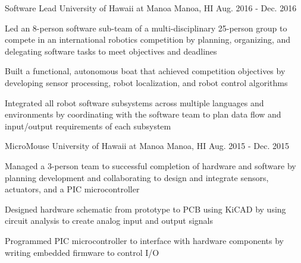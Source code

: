 

\begin{cventries}

  \cventry
    {Software Lead} %
    {University of Hawaii at Manoa} %
    {Manoa, HI} %
    {Aug. 2016 - Dec. 2016} %
    {
      \begin{cvitems} %
      \item Led an 8-person software sub-team of a multi-disciplinary 25-person group to compete in an international robotics competition by planning, organizing, and delegating software tasks to meet objectives and deadlines
      \item Built a functional, autonomous boat that achieved competition objectives by developing sensor processing, robot localization, and robot control algorithms
      \item Integrated all robot software subsystems across multiple languages and environments by coordinating with the software team to plan data flow and input/output requirements of each subsystem
      \end{cvitems}
    }

  \cventry
    {MicroMouse} %
    {University of Hawaii at Manoa} %
    {Manoa, HI} %
    {Aug. 2015 - Dec. 2015} %
    {
      \begin{cvitems} %
      \item Managed a 3-person team to successful completion of hardware and software by planning development and collaborating to design and integrate sensors, actuators, and a PIC microcontroller
      \item Designed hardware schematic from prototype to PCB using KiCAD by using circuit analysis to create analog input and output signals
      \item Programmed PIC microcontroller to interface with hardware components by writing embedded firmware to control I/O
      \end{cvitems}
    }

\end{cventries}
